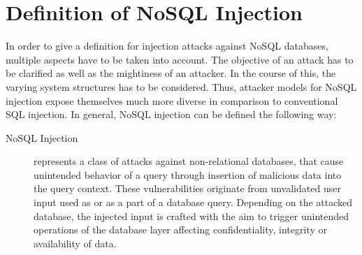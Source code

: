 \section{Definition of NoSQL Injection}

In order to give a definition for injection attacks against NoSQL databases, multiple aspects have to be taken into account. The objective of an attack has to be clarified as well as the mightiness of an attacker. In the course of this, the varying system structures has to be considered. Thus, attacker models for NoSQL injection expose themselves much more diverse in comparison to conventional SQL injection. In general, NoSQL injection can be defined the following way:\\

\begin{description}
\item [NoSQL Injection] represents a class of attacks against non-relational databases, that cause unintended behavior of a query through insertion of malicious data into the query context. These vulnerabilities originate from unvalidated user input used as or as a part of a database query. Depending on the attacked database, the injected input is crafted with the aim to trigger unintended operations of the database layer affecting confidentiality, integrity or availability of data.
\end{description}

